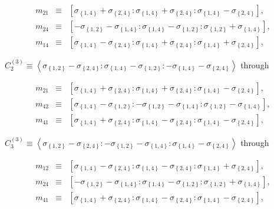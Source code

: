 \documentclass[11pt]{article}
\begin{document}
\begin{eqnarray*}
m_{21} &\equiv &\left[ \sigma _{\left\{ 1,4\right\} }+\sigma _{\left\{
2,4\right\} }:\sigma _{\left\{ 1,4\right\} }+\sigma _{\left\{ 2,4\right\}
}:\sigma _{\left\{ 1,4\right\} }-\sigma _{\left\{ 2,4\right\} }\right] , \\
m_{24} &\equiv &\left[ -\sigma _{\left\{ 1,2\right\} }-\sigma _{\left\{
1,4\right\} }:\sigma _{\left\{ 1,4\right\} }-\sigma _{\left\{ 1,2\right\}
}:\sigma _{\left\{ 1,2\right\} }+\sigma _{\left\{ 1,4\right\} }\right] , \\
m_{14} &\equiv &\left[ \sigma _{\left\{ 1,4\right\} }-\sigma _{\left\{
2,4\right\} }:\sigma _{\left\{ 1,4\right\} }+\sigma _{\left\{ 2,4\right\}
}:\sigma _{\left\{ 1,4\right\} }+\sigma _{\left\{ 2,4\right\} }\right] ,
\end{eqnarray*}

$C_{2}^{\left( 3\right) }\equiv \left\langle \sigma _{\left\{ 1,2\right\}
}-\sigma _{\left\{ 2,4\right\} }:\sigma _{\left\{ 1,4\right\} }-\sigma
_{\left\{ 1,2\right\} }:-\sigma _{\left\{ 1,4\right\} }-\sigma _{\left\{
2,4\right\} }\right\rangle $ through

\begin{eqnarray*}
m_{21} &\equiv &\left[ \sigma _{\left\{ 1,4\right\} }+\sigma _{\left\{
2,4\right\} }:\sigma _{\left\{ 1,4\right\} }+\sigma _{\left\{ 2,4\right\}
}:\sigma _{\left\{ 1,4\right\} }-\sigma _{\left\{ 2,4\right\} }\right] , \\
m_{42} &\equiv &\left[ \sigma _{\left\{ 1,4\right\} }-\sigma _{\left\{
1,2\right\} }:-\sigma _{\left\{ 1,2\right\} }-\sigma _{\left\{ 1,4\right\}
}:\sigma _{\left\{ 1,2\right\} }-\sigma _{\left\{ 1,4\right\} }\right] , \\
m_{41} &\equiv &\left[ \sigma _{\left\{ 1,4\right\} }+\sigma _{\left\{
2,4\right\} }:\sigma _{\left\{ 1,4\right\} }-\sigma _{\left\{ 2,4\right\}
}:\sigma _{\left\{ 1,4\right\} }-\sigma _{\left\{ 2,4\right\} }\right] ,
\end{eqnarray*}

$C_{3}^{\left( 3\right) }\equiv \left\langle \sigma _{\left\{ 1,2\right\}
}-\sigma _{\left\{ 2,4\right\} }:-\sigma _{\left\{ 1,2\right\} }-\sigma
_{\left\{ 1,4\right\} }:\sigma _{\left\{ 1,4\right\} }-\sigma _{\left\{
2,4\right\} }\right\rangle $ through

\begin{eqnarray*}
m_{12} &\equiv &\left[ \sigma _{\left\{ 1,4\right\} }-\sigma _{\left\{
2,4\right\} }:\sigma _{\left\{ 1,4\right\} }-\sigma _{\left\{ 2,4\right\}
}:\sigma _{\left\{ 1,4\right\} }+\sigma _{\left\{ 2,4\right\} }\right] , \\
m_{24} &\equiv &\left[ -\sigma _{\left\{ 1,2\right\} }-\sigma _{\left\{
1,4\right\} }:\sigma _{\left\{ 1,4\right\} }-\sigma _{\left\{ 1,2\right\}
}:\sigma _{\left\{ 1,2\right\} }+\sigma _{\left\{ 1,4\right\} }\right] , \\
m_{41} &\equiv &\left[ \sigma _{\left\{ 1,4\right\} }+\sigma _{\left\{
2,4\right\} }:\sigma _{\left\{ 1,4\right\} }-\sigma _{\left\{ 2,4\right\}
}:\sigma _{\left\{ 1,4\right\} }-\sigma _{\left\{ 2,4\right\} }\right] ,
\end{eqnarray*}
\end{document}
